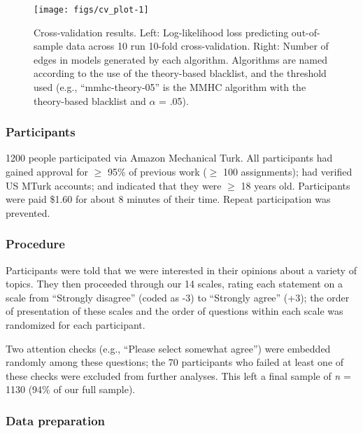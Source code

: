 \documentclass[10pt, letterpaper]{article}
\newenvironment{CodeChunk}{}{}
\begin{document}
\begin{CodeChunk}
\begin{figure*}[h]

{\centering \texttt{[image: figs/cv\_plot-1]} 

}

\caption[Cross-validation results]{Cross-validation results. Left: Log-likelihood loss predicting out-of-sample data across 10 run 10-fold cross-validation. Right: Number of edges in models generated by each algorithm. Algorithms are named according to the use of the theory-based blacklist, and the threshold used (e.g., “mmhc-theory-05” is the MMHC algorithm with the theory-based blacklist and $\alpha$ = .05).}\label{fig:cv_plot}
\end{figure*}
\end{CodeChunk}

\subsubsection{Participants}\label{participants}

1200 people participated via Amazon Mechanical Turk. All participants
had gained approval for \(\geq\) 95\% of previous work (\(\geq\) 100
assignments); had verified US MTurk accounts; and indicated that they
were \(\geq\) 18 years old. Participants were paid \$1.60 for about 8
minutes of their time. Repeat participation was prevented.

\subsubsection{Procedure}\label{procedure}

Participants were told that we were interested in their opinions about a
variety of topics. They then proceeded through our 14 scales, rating
each statement on a scale from ``Strongly disagree'' (coded as -3) to
``Strongly agree'' (+3); the order of presentation of these scales and
the order of questions within each scale was randomized for each
participant.

Two attention checks (e.g., ``Please select somewhat agree'') were
embedded randomly among these questions; the 70 participants who failed
at least one of these checks were excluded from further analyses. This
left a final sample of \emph{n} = 1130 (94\% of our full sample).

\subsubsection{Data preparation}\label{data-preparation}
\end{document}
